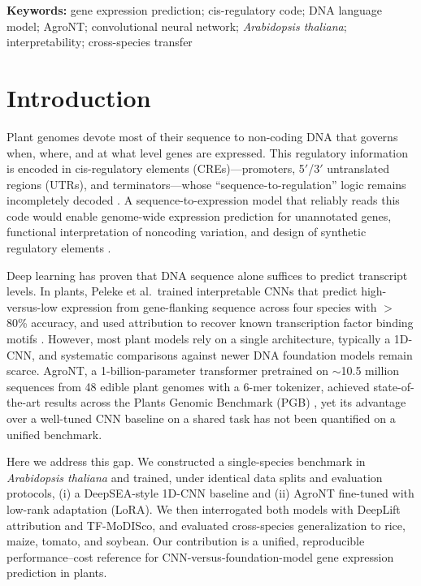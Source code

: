 \documentclass[11pt,a4paper]{article}
\begin{document}
\noindent\textbf{Keywords:} gene expression prediction; cis-regulatory code; DNA language model; AgroNT; convolutional neural network; \emph{Arabidopsis thaliana}; interpretability; cross-species transfer

\vspace{0.5em}

\section{Introduction}
Plant genomes devote most of their sequence to non-coding DNA that governs when, where, and at what level genes are expressed. This regulatory information is encoded in cis-regulatory elements (CREs)---promoters, 5$'$/3$'$ untranslated regions (UTRs), and terminators---whose ``sequence-to-regulation'' logic remains incompletely decoded \cite{marand2023}. A sequence-to-expression model that reliably reads this code would enable genome-wide expression prediction for unannotated genes, functional interpretation of noncoding variation, and design of synthetic regulatory elements \cite{hu2023}.

Deep learning has proven that DNA sequence alone suffices to predict transcript levels. In plants, Peleke et al.\ trained interpretable CNNs that predict high-versus-low expression from gene-flanking sequence across four species with $>$80\% accuracy, and used attribution to recover known transcription factor binding motifs \cite{peleke2024}. However, most plant models rely on a single architecture, typically a 1D-CNN, and systematic comparisons against newer DNA foundation models remain scarce. AgroNT, a 1-billion-parameter transformer pretrained on $\sim$10.5 million sequences from 48 edible plant genomes with a 6-mer tokenizer, achieved state-of-the-art results across the Plants Genomic Benchmark (PGB) \cite{mendoza2024,pgb2024}, yet its advantage over a well-tuned CNN baseline on a shared task has not been quantified on a unified benchmark.

Here we address this gap. We constructed a single-species benchmark in \emph{Arabidopsis thaliana} and trained, under identical data splits and evaluation protocols, (i) a DeepSEA-style 1D-CNN baseline and (ii) AgroNT fine-tuned with low-rank adaptation (LoRA). We then interrogated both models with DeepLift attribution and TF-MoDISco, and evaluated cross-species generalization to rice, maize, tomato, and soybean. Our contribution is a unified, reproducible performance--cost reference for CNN-versus-foundation-model gene expression prediction in plants.
\end{document}
